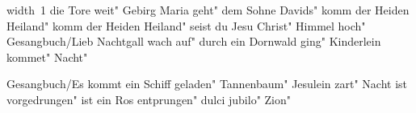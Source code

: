 \ifx\mxversion\undefined
  
  
  
  
\fi

%
\hbox{\pdfximage width 1\pdfrefximage\pdflastximage}\vfill\eject
\tableofcontents
\normalmusicsize
 die Tore weit"
 Gebirg Maria geht"
 dem Sohne Davids"
 komm der Heiden Heiland"
 komm der Heiden Heiland"
 seist du Jesu Christ"
 Himmel hoch"
 Gesangbuch/Lieb Nachtgall wach auf"
 durch ein Dornwald ging"
 Kinderlein kommet"
 Nacht"

 Gesangbuch/Es kommt ein Schiff geladen"
 Tannenbaum"
\makeatletter
{}
\makeatother
 Jesulein zart"
\makeatletter
{}
\makeatother
 Nacht ist vorgedrungen"
 ist ein Ros entprungen"
\makeatletter
{}
\makeatother
 dulci jubilo"
\makeatletter
{}
\makeatother
 Zion"
\bookbye